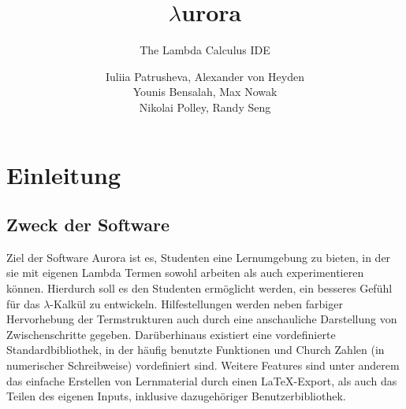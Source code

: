 \documentclass[parskip=full,11pt,twoside]{scrbook}
\title{$\lambda$urora}
\subtitle{The Lambda Calculus IDE}
\author{Iuliia Patrusheva, Alexander von Heyden\\
Younis Bensalah, Max Nowak\\
Nikolai Polley, Randy Seng}
\begin{document}
\maketitle
\pagebreak
\setcounter{tocdepth}{4}
\tableofcontents

\newpage
\section{Einleitung}

\subsection{Zweck der Software}
Ziel der Software Aurora ist es, Studenten eine Lernumgebung zu bieten, in der sie mit eigenen Lambda Termen sowohl arbeiten als auch experimentieren können.
Hierdurch soll es den Studenten ermöglicht werden, ein besseres Gefühl für das $\lambda$-Kalkül zu entwickeln.
Hilfestellungen werden neben farbiger Hervorhebung der Termstrukturen auch durch eine anschauliche Darstellung von Zwischenschritte gegeben.
Darüberhinaus existiert eine vordefinierte Standardbibliothek, in der häufig benutzte Funktionen und Church Zahlen (in numerischer Schreibweise) vordefiniert sind.
\newline
Weitere Features sind unter anderem das einfache Erstellen von Lernmaterial durch einen \LaTeX-Export, als auch das Teilen des eigenen Inputs, inklusive dazugehöriger Benutzerbibliothek.
\end{document}
